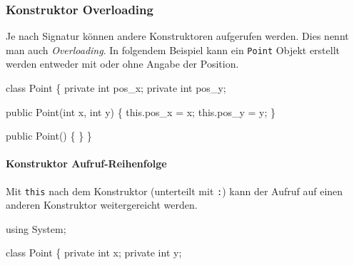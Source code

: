 \documentclass[
  9pt,
  a4paperpaper,
  DIV=11]{scrartcl}
\let\oldparagraph\paragraph
\renewcommand{\paragraph}[1]{\oldparagraph{#1}\mbox{}}
\newenvironment{Shaded}{}{}
\newcommand{\DataTypeTok}[1]{\textcolor[rgb]{0.84,0.23,0.29}{#1}}
\newcommand{\FunctionTok}[1]{\textcolor[rgb]{0.44,0.26,0.76}{#1}}
\newcommand{\KeywordTok}[1]{\textcolor[rgb]{0.84,0.23,0.29}{#1}}
\newcommand{\NormalTok}[1]{\textcolor[rgb]{0.14,0.16,0.18}{#1}}
\newcommand{\OperatorTok}[1]{\textcolor[rgb]{0.14,0.16,0.18}{#1}}
\numberwithin{equation}{section}
\begin{document}
\begin{multicols}{2}
\begin{tcolorbox}
\end{tcolorbox}

\hypertarget{konstruktor-overloading}{%
\subsubsection{Konstruktor Overloading}\label{konstruktor-overloading}}

Je nach Signatur können andere Konstruktoren aufgerufen werden. Dies
nennt man auch \emph{Overloading}. In folgendem Beispiel kann ein
\texttt{Point} Objekt erstellt werden entweder mit oder ohne Angabe der
Position.

\begin{Shaded}
\begin{Highlighting}[]
\KeywordTok{class}\NormalTok{ Point }\OperatorTok{\{}
  \KeywordTok{private} \DataTypeTok{int}\NormalTok{ pos\_x}\OperatorTok{;}
  \KeywordTok{private} \DataTypeTok{int}\NormalTok{ pos\_y}\OperatorTok{;}

  \KeywordTok{public} \FunctionTok{Point}\OperatorTok{(}\DataTypeTok{int}\NormalTok{ x}\OperatorTok{,} \DataTypeTok{int}\NormalTok{ y}\OperatorTok{)} \OperatorTok{\{}
    \KeywordTok{this}\OperatorTok{.}\FunctionTok{pos\_x} \OperatorTok{=}\NormalTok{ x}\OperatorTok{;}
    \KeywordTok{this}\OperatorTok{.}\FunctionTok{pos\_y} \OperatorTok{=}\NormalTok{ y}\OperatorTok{;}
  \OperatorTok{\}}

  \KeywordTok{public} \FunctionTok{Point}\OperatorTok{()} \OperatorTok{\{} \OperatorTok{\}}
\OperatorTok{\}}
\end{Highlighting}
\end{Shaded}

\hypertarget{konstruktor-aufruf-reihenfolge}{%
\paragraph{Konstruktor
Aufruf-Reihenfolge}\label{konstruktor-aufruf-reihenfolge}}

Mit \texttt{this} nach dem Konstruktor (unterteilt mit \texttt{:}) kann
der Aufruf auf einen anderen Konstruktor weitergereicht werden.

\begin{Shaded}
\begin{Highlighting}[]
\KeywordTok{using}\NormalTok{ System}\OperatorTok{;}

\KeywordTok{class}\NormalTok{ Point }\OperatorTok{\{}
  \KeywordTok{private} \DataTypeTok{int}\NormalTok{ x}\OperatorTok{;}
  \KeywordTok{private} \DataTypeTok{int}\NormalTok{ y}\OperatorTok{;}


\end{Highlighting}
\end{Shaded}
\end{multicols}
\end{document}

